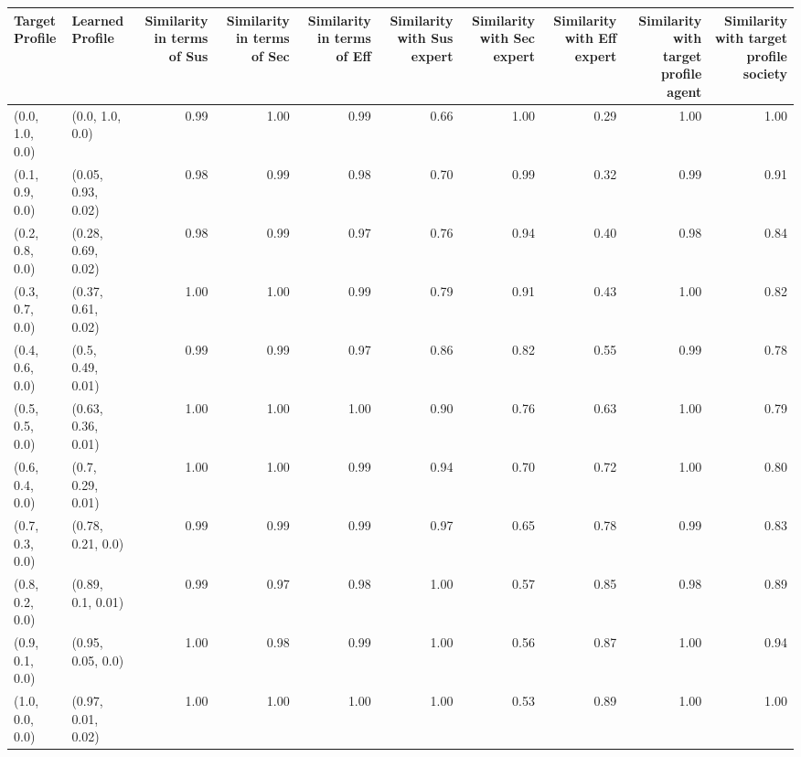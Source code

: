 \begin{tabular}{llrrrrrrrr}
\toprule
Target Profile & Learned Profile & Similarity in terms of Sus & Similarity in terms of Sec & Similarity in terms of Eff & Similarity with Sus expert & Similarity with Sec expert & Similarity with Eff expert & Similarity with target profile agent & Similarity with target profile society \\
\midrule
(0.0, 1.0, 0.0) & (0.0, 1.0, 0.0) & 0.99 & 1.00 & 0.99 & 0.66 & 1.00 & 0.29 & 1.00 & 1.00 \\
(0.1, 0.9, 0.0) & (0.05, 0.93, 0.02) & 0.98 & 0.99 & 0.98 & 0.70 & 0.99 & 0.32 & 0.99 & 0.91 \\
(0.2, 0.8, 0.0) & (0.28, 0.69, 0.02) & 0.98 & 0.99 & 0.97 & 0.76 & 0.94 & 0.40 & 0.98 & 0.84 \\
(0.3, 0.7, 0.0) & (0.37, 0.61, 0.02) & 1.00 & 1.00 & 0.99 & 0.79 & 0.91 & 0.43 & 1.00 & 0.82 \\
(0.4, 0.6, 0.0) & (0.5, 0.49, 0.01) & 0.99 & 0.99 & 0.97 & 0.86 & 0.82 & 0.55 & 0.99 & 0.78 \\
(0.5, 0.5, 0.0) & (0.63, 0.36, 0.01) & 1.00 & 1.00 & 1.00 & 0.90 & 0.76 & 0.63 & 1.00 & 0.79 \\
(0.6, 0.4, 0.0) & (0.7, 0.29, 0.01) & 1.00 & 1.00 & 0.99 & 0.94 & 0.70 & 0.72 & 1.00 & 0.80 \\
(0.7, 0.3, 0.0) & (0.78, 0.21, 0.0) & 0.99 & 0.99 & 0.99 & 0.97 & 0.65 & 0.78 & 0.99 & 0.83 \\
(0.8, 0.2, 0.0) & (0.89, 0.1, 0.01) & 0.99 & 0.97 & 0.98 & 1.00 & 0.57 & 0.85 & 0.98 & 0.89 \\
(0.9, 0.1, 0.0) & (0.95, 0.05, 0.0) & 1.00 & 0.98 & 0.99 & 1.00 & 0.56 & 0.87 & 1.00 & 0.94 \\
(1.0, 0.0, 0.0) & (0.97, 0.01, 0.02) & 1.00 & 1.00 & 1.00 & 1.00 & 0.53 & 0.89 & 1.00 & 1.00 \\
\bottomrule
\end{tabular}
